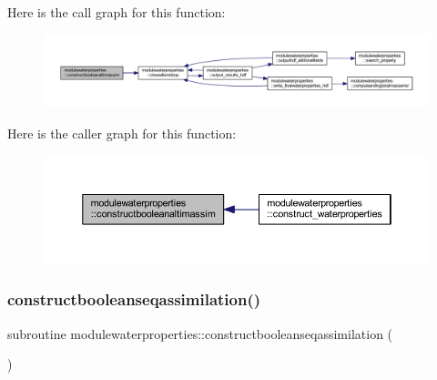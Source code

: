 Here is the call graph for this function\+:\nopagebreak
\begin{figure}[H]
\begin{center}
\leavevmode
\includegraphics[width=350pt]{namespacemodulewaterproperties_a48d5c887c475fa7e3e29d35f55262ade_cgraph}
\end{center}
\end{figure}
Here is the caller graph for this function\+:\nopagebreak
\begin{figure}[H]
\begin{center}
\leavevmode
\includegraphics[width=350pt]{namespacemodulewaterproperties_a48d5c887c475fa7e3e29d35f55262ade_icgraph}
\end{center}
\end{figure}
\mbox{\label{namespacemodulewaterproperties_aa5d8008c930a03a6746ab2ae44f44f14}} 
\subsubsection{\texorpdfstring{constructbooleanseqassimilation()}{constructbooleanseqassimilation()}}
{\footnotesize\ttfamily subroutine modulewaterproperties\+::constructbooleanseqassimilation (\begin{DoxyParamCaption}{ }\end{DoxyParamCaption})\hspace{0.3cm}{\ttfamily [private]}}

